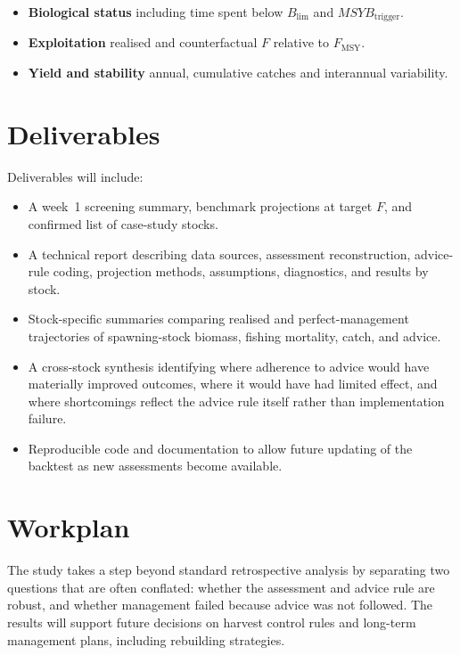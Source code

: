 \documentclass[11pt,a4paper]{extarticle}
\newcommand{\added}[1]{%
	\par\vspace{0.3em}\noindent
	\colorbox{yellow!35}{\parbox{\dimexpr\linewidth-2\fboxsep-2\fboxrule\relax}{#1}}%
	\par\vspace{0.3em}%
}
\begin{document}
	\begin{itemize}
		\item \textbf{Biological status} including time spent below \(B_{\lim}\) and \(MSYB_{\mathrm{trigger}}\).
		\item \textbf{Exploitation} realised and counterfactual \(F\) relative to \(F_{\mathrm{MSY}}\).
		\item \textbf{Yield and stability} annual, cumulative catches and interannual variability.
	\end{itemize}
	
	\section*{Deliverables}	
	Deliverables will include:
	
	\begin{itemize}
		\item \added{A week~1 screening summary, benchmark projections at target $F$, and confirmed list of case-study stocks.}
		\item A technical report describing data sources, assessment reconstruction, advice-rule coding, projection methods, assumptions, diagnostics, and results by stock.
		\item Stock-specific summaries comparing realised and perfect-management trajectories of spawning-stock biomass, fishing mortality, catch, and advice.
		\item A cross-stock synthesis identifying where adherence to advice would have materially improved outcomes, where it would have had limited effect, and where shortcomings reflect the advice rule itself rather than implementation failure.
		\item Reproducible code and documentation to allow future updating of the backtest as new assessments become available.
	\end{itemize}
	
	\section*{Workplan}
	The study takes a step beyond standard retrospective analysis by separating two questions that are often conflated: whether the assessment and advice rule are robust, and whether management failed because advice was not followed. The results will support future decisions on harvest control rules and long-term management plans, including rebuilding strategies.
	
\end{document}
